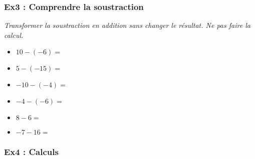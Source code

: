 \subsubsection*{Ex3 : Comprendre la soustraction}

\textit{Transformer la soustraction en addition sans changer le résultat. Ne pas faire la calcul.}

\begin{multicols}{3}

\begin{itemize}[label={$\bullet$}]
  \item $10 - (-6) = $ \dotfill
  \item $5 - (-15) = $ \dotfill
  \item $-10 - (-4) = $ \dotfill
  \item $-4 - (-6) = $ \dotfill
  \item $8 - 6 = $ \dotfill
  \item $-7 - 16 = $ \dotfill
\end{itemize}

\end{multicols}

\subsubsection*{Ex4 : Calculs}

